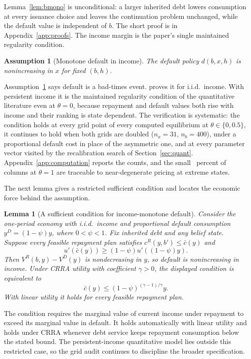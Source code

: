 \documentclass[11pt]{article}
\newtheorem{lemma}{Lemma}
\newtheorem{assumption}{Assumption}
\theoremstyle{definition}
\begin{document}
Lemma~\ref{lem:bmono} is unconditional: a larger inherited debt lowers consumption at every issuance choice and leaves the continuation problem unchanged, while the default value is independent of $b$. The short proof is in Appendix~\ref{app:proofs}. The income margin is the paper's single maintained regularity condition.

\begin{assumption}[Monotone default in income]\label{ass:monotone}
The default policy $d(b, x, h)$ is nonincreasing in $x$ for fixed $(b, h)$.
\end{assumption}

Assumption~\ref{ass:monotone} says default is a bad-times event. \citet{Arellano2008} proves it for i.i.d.\ income. With persistent income it is the maintained regularity condition of the quantitative literature even at $\theta = 0$, because repayment and default values both rise with income and their ranking is state dependent. The verification is systematic: the condition holds at every grid point of every computed equilibrium at $\theta \in \{0, 0.5\}$, it continues to hold when both grids are doubled ($n_x = 31$, $n_b = 400$), under a proportional default cost in place of the asymmetric one, and at every parameter vector visited by the recalibration search of Section~\ref{sec:quant}. Appendix~\ref{app:computation} reports the counts, and the small \MonoViolGDOnepct\ percent of columns at $\theta = 1$ are traceable to near-degenerate pricing at extreme states.

The next lemma gives a restricted sufficient condition and locates the economic force behind the assumption.

\begin{lemma}[A sufficient condition for income-monotone default]\label{lem:income_sufficient}
Consider the one-period economy with i.i.d.\ income and proportional default consumption $y^D=(1-\psi)y$, where $0<\psi<1$. Fix inherited debt and any belief state. Suppose every feasible repayment plan satisfies $c^R(y,b')\leq \bar c(y)$ and
\[
u'\!\left(\bar c(y)\right)
\geq (1-\psi)u'\!\left((1-\psi)y\right).
\]
Then $V^R(b,y)-V^D(y)$ is nondecreasing in $y$, so default is nonincreasing in income. Under CRRA utility with coefficient $\gamma>0$, the displayed condition is equivalent to
\[
\bar c(y)\leq (1-\psi)^{(\gamma-1)/\gamma}y.
\]
With linear utility it holds for every feasible repayment plan.
\end{lemma}

The condition requires the marginal value of current income under repayment to exceed its marginal value in default. It holds automatically with linear utility and holds under CRRA whenever debt service keeps repayment consumption below the stated bound. The persistent-income quantitative model lies outside this restricted case, so the grid audit continues to discipline the broader specification.
\end{document}
